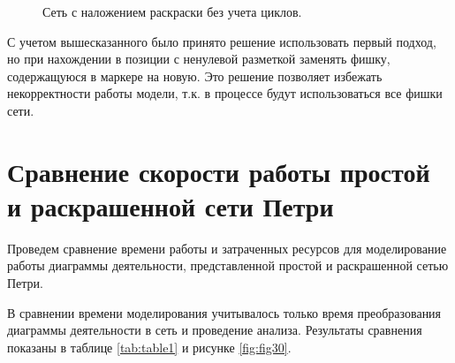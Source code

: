 \begin{figure}
\begin{minipage}[H]{0.49\linewidth}
		\caption{Сеть с наложением раскраски без учета циклов.}
		\label{fig:fig26}
	\end{minipage}
\end{figure}

С учетом вышесказанного было принято решение использовать первый подход, но при нахождении в позиции с ненулевой разметкой заменять фишку, содержащуюся в маркере на новую. Это решение позволяет избежать некорректности работы модели, т.к. в процессе будут использоваться все фишки сети.

\section{Сравнение скорости работы простой и раскрашенной сети Петри}

Проведем сравнение времени работы и затраченных ресурсов для моделирование работы диаграммы деятельности, представленной простой и раскрашенной сетью Петри.

В сравнении времени моделирования учитывалось только время преобразования диаграммы деятельности в сеть и проведение анализа. Результаты сравнения показаны в таблице \ref{tab:table1} и рисунке \ref{fig:fig30}.

